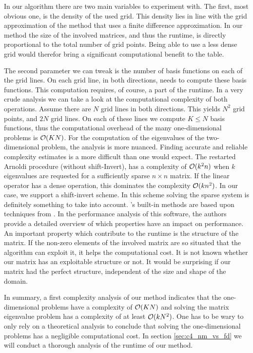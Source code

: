 In our algorithm there are two main variables to experiment with. The first, most obvious one, is the density of the used grid. This density lies in line with the grid approximation of the method that uses a finite difference approximation. In our method the size of the involved matrices, and thus the runtime, is directly proportional to the total number of grid points. Being able to use a less dense grid would therefor bring a significant computational benefit to the table.

The second parameter we can tweak is the number of basis functions on each of the grid lines. On each grid line, in both directions, \matslise needs to compute these basis functions. This computation requires, of course, a part of the runtime. In a very crude analysis we can take a look at the computational complexity of both operations. Assume there are $N$ grid lines in both directions. This yields $N^2$ grid points, and $2N$ grid lines. On each of these lines we compute $K \leq N$ basis functions, thus the computational overhead of the many one-dimensional problems is $\operatorname{\mathcal{O}}(K N)$. For the computation of the eigenvalues of the two-dimensional problem, the analysis is more nuanced. Finding accurate and reliable complexity estimates is a more difficult than one would expect. The restarted Arnoldi procedure (without shift-Invert), has a complexity of $\operatorname{\mathcal{O}}(k^2 n)$ when $k$ eigenvalues are requested for a sufficiently sparse $n \times n$ matrix\cite{lee_k2n_2009}. If the linear operator has a dense operation, this dominates the complexity $\operatorname{\mathcal{O}}(k n^2)$. In our case, we support a shift-invert scheme. In this scheme solving the sparse system is definitely something to take into account. \Eigen's built-in methods are based upon techniques from \superlu{}\cite{demmel_supernodal_1999,li_overview_2005}. In the performance analysis of this software, the authors provide a detailed overview of which properties have an impact on performance. An important property which contribute to the runtime is the structure of the matrix. If the non-zero elements of the involved matrix are so situated that the algorithm can exploit it, it helps the computational cost. It is not known whether our matrix has an exploitable structure or not. It would be surprising if our matrix had the perfect structure, independent of the size and shape of the domain.

In summary, a first complexity analysis of our method indicates that the one-dimensional problems have a complexity of $\operatorname{\mathcal{O}}(K N)$ and solving the matrix eigenvalue problem has a complexity of at least $\operatorname{\mathcal{O}}(k N^2)$. One has to be wary to only rely on a theoretical analysis to conclude that solving the one-dimensional problems has a negligible computational cost. In section \ref{sec:c4_nm_vs_fd} we will conduct a thorough analysis of the runtime of our method.

